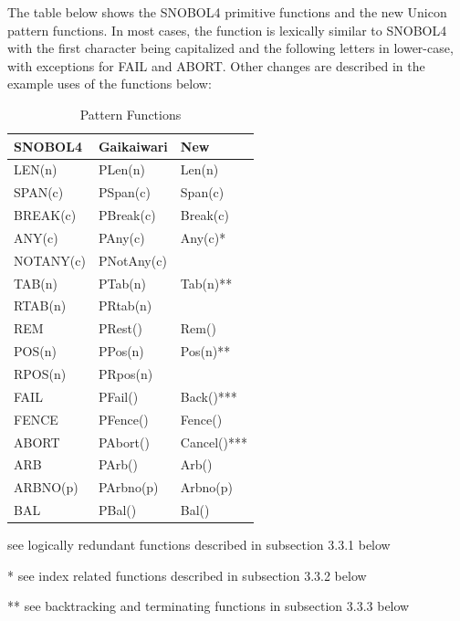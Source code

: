 \documentclass{article}
\begin{document}
The table below shows the SNOBOL4 primitive functions and the new Unicon pattern functions.  In most cases, the function is lexically similar to SNOBOL4 with the first character being capitalized and the following letters in lower-case, with exceptions for FAIL and ABORT.  Other changes are described in the example uses of the functions below: \\

\begin{table}[ht]
	\centering
	\caption{Pattern Functions}
	\begin{threeparttable}
		\centering
		\begin{tabular}{|l|l|l|}
			\hline\hline
			SNOBOL4 & Gaikaiwari & New \\
			\hline
			LEN(n) & PLen(n) & Len(n) \\
			SPAN(c) & PSpan(c) & Span(c)  \\
			BREAK(c) & PBreak(c) & Break(c) \\
			ANY(c) & PAny(c) & Any(c)* \\
			NOTANY(c) & PNotAny(c) &  \\
			TAB(n) & PTab(n) & Tab(n)** \\
			RTAB(n) & PRtab(n) &  \\
			REM & PRest() & Rem() \\
			POS(n) & PPos(n) & Pos(n)**  \\
			RPOS(n) & PRpos(n) &  \\
			FAIL & PFail() & Back()*** \\
			FENCE & PFence() & Fence() \\
			ABORT & PAbort() & Cancel()*** \\
			ARB & PArb() & Arb() \\
			ARBNO(p) & PArbno(p) & Arbno(p) \\
			BAL & PBal() & Bal() \\
			\hline
		\end{tabular}
		
		\begin{tablenotes}
      		\small
      		\item * see logically redundant functions described in subsection 3.3.1 below
      		\item ** see index related functions described in subsection 3.3.2 below
      		\item *** see backtracking and terminating functions in subsection 3.3.3 below
      	\end{tablenotes}
	\end{threeparttable}
\end{table}
\end{document}
